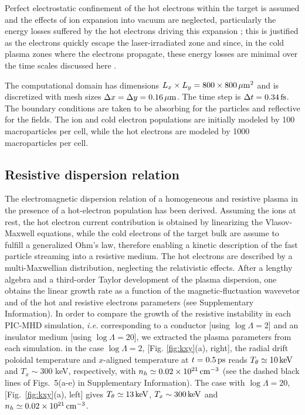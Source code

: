 \documentclass[aps,twocolumn,showpacs,superscriptaddress]{revtex4}
\begin{document}
Perfect electrostatic confinement of the hot electrons within the target is assumed and the effects of ion expansion into vacuum are neglected, particularly the energy losses suffered by the hot electrons driving this expansion \cite{POP_Antici_2013}; this is justified as the electrons quickly escape the laser-irradiated zone and since, in the cold plasma zones where the electrons propagate, these energy losses are minimal over the time scales discussed here \cite{PRL_Mora_2009}. 

The computational domain has dimensions
$L_x\times L_y=800 \times 800\,\rm \mu m^2$ and is discretized with mesh sizes $\Delta x=\Delta y =0.16\,\rm \mu m$. The time step is $\Delta t=0.34\,\rm fs$. The boundary conditions are taken to be absorbing for the particles and reflective for the fields. The ion and cold electron populations are initially modeled by 100 macroparticles per cell, while the hot electrons are modeled by 1000 macroparticles per cell.

\subsection*{ Resistive dispersion relation}
The electromagnetic dispersion relation of a homogeneous and resistive plasma in the presence of a hot-electron population has been derived. 
Assuming the ions at rest,  the hot electron current contribution is obtained by linearizing the Vlasov-Maxwell equations, while the cold electrons  of the target bulk are assume to fulfill a generalized Ohm's law, therefore enabling a kinetic description of the fast particle streaming into a resistive medium.
The  hot electrons are described by a  multi-Maxwellian distribution, neglecting the relativistic effects.
After a lengthy algebra and  a third-order Taylor development of the plasma dispersion, one obtains the linear growth rate as a function of the magnetic-fluctuation wavevetor and of the hot and resistive electrons parameters  (see Supplementary Information).
In order to compare the growth of the resistive instability in each PIC-MHD simulation, \emph{i.e.} corresponding to a conductor  [using $\log \Lambda=2$] and  an insulator medium [using $\log \Lambda=20$], we  extracted the plasma parameters from each simulation. 
in the case $\log \Lambda=2$, [Fig. \ref{fig:kxy}(a), right], the radial drift  poloidal temperature and $x$-aligned temperature at $t=0.5\,\rm ps$ reads
$T_\theta \simeq 10\,\rm keV$ and 
$T_x \sim 300$ keV, respectively, with $n_h\simeq 0.02 \times 10^{21}\,\rm cm^{-3}$ (see the dashed black lines of Figs.~5(a-e) in Supplementary Information). The case with $\log \Lambda =20$, [Fig.~\ref{fig:kxy}(a), left] gives $T_\theta \simeq 13\,\rm keV$,
$T_x \sim 300\,\rm keV$ and $n_h\simeq 0.02 \times 10^{21}\,\rm cm^{-3}$. 
\end{document}
